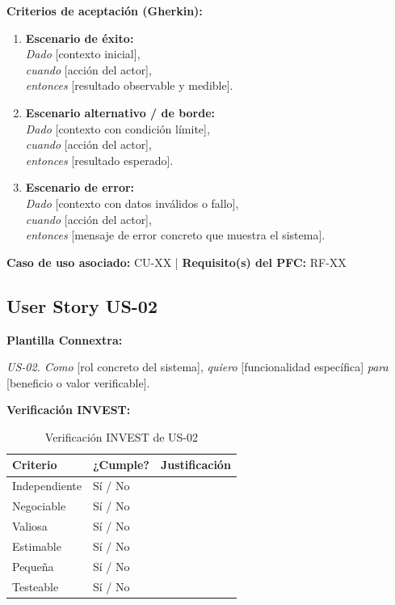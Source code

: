 \documentclass[journal,onecolumn]{IEEEtran}
\begin{document}
\textbf{Criterios de aceptación (Gherkin):}

\begin{enumerate}[leftmargin=*]
  \item \textbf{Escenario de éxito:}\\
        \textit{Dado} [contexto inicial],\\
        \textit{cuando} [acción del actor],\\
        \textit{entonces} [resultado observable y medible].

  \item \textbf{Escenario alternativo / de borde:}\\
        \textit{Dado} [contexto con condición límite],\\
        \textit{cuando} [acción del actor],\\
        \textit{entonces} [resultado esperado].

  \item \textbf{Escenario de error:}\\
        \textit{Dado} [contexto con datos inválidos o fallo],\\
        \textit{cuando} [acción del actor],\\
        \textit{entonces} [mensaje de error concreto que muestra el sistema].
\end{enumerate}

\textbf{Caso de uso asociado:} CU-XX | \textbf{Requisito(s) del PFC:} RF-XX

\subsection{User Story US-02}

\textbf{Plantilla Connextra:}

\begin{mdframed}[style=guia]
\textit{US-02. Como} [rol concreto del sistema], \textit{quiero} [funcionalidad específica]
\textit{para} [beneficio o valor verificable].
\end{mdframed}

\textbf{Verificación INVEST:}

\begin{table}[H]
\caption{Verificación INVEST de US-02}
\label{tab:invest02}
\begin{tabularx}{\textwidth}{|l|l|X|}
\hline
\textbf{Criterio} & \textbf{¿Cumple?} & \textbf{Justificación} \\
\hline
Independiente  & Sí / No & \\
\hline
Negociable     & Sí / No & \\
\hline
Valiosa        & Sí / No & \\
\hline
Estimable      & Sí / No & \\
\hline
Pequeña        & Sí / No & \\
\hline
Testeable      & Sí / No & \\
\hline
\end{tabularx}
\end{table}
\end{document}
